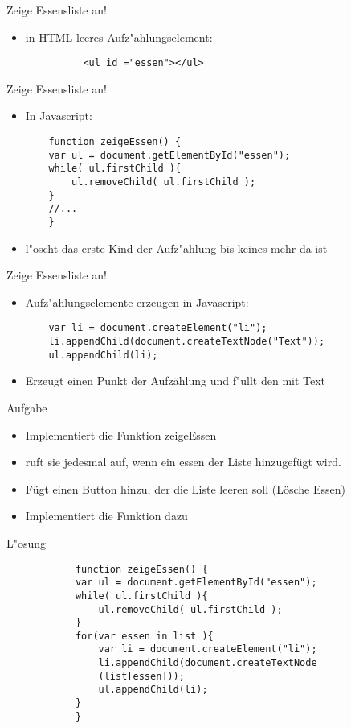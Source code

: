 \documentclass[18pt]{beamer}
\begin{document}
\begin{frame}[fragile]{Zeige Essensliste an!}
\begin{itemize}
	\item in HTML leeres Aufz"ahlungselement:
	\begin{lstlisting}
		  <ul id ="essen"></ul>
	\end{lstlisting}
\end{itemize}
\end{frame}
\begin{frame}[fragile]{Zeige Essensliste an!}
\begin{itemize}
	\item In Javascript: 
	\begin{lstlisting}
	function zeigeEssen() {
	var ul = document.getElementById("essen");
	while( ul.firstChild ){
		ul.removeChild( ul.firstChild );
	}
	//...
	}
	\end{lstlisting}
	\item l"oscht das erste Kind der Aufz"ahlung bis keines mehr da ist
\end{itemize}
\end{frame}

\begin{frame}[fragile]{Zeige Essensliste an!}
\begin{itemize}
	\item Aufz"ahlungselemente erzeugen in Javascript: 
	\begin{lstlisting}
	var li = document.createElement("li");
	li.appendChild(document.createTextNode("Text"));
	ul.appendChild(li);
	\end{lstlisting}
	\item Erzeugt einen Punkt der Aufzählung und f"ullt den mit Text
\end{itemize}
\end{frame}


\begin{frame}[fragile]{Aufgabe}
\begin{itemize}
	\item Implementiert die Funktion zeigeEssen
	\item ruft sie jedesmal auf, wenn ein essen der Liste hinzugefügt wird.
	\item Fügt einen Button hinzu, der die Liste leeren soll (Lösche Essen)
	\item Implementiert die Funktion dazu
\end{itemize}
\end{frame}

\begin{frame}[fragile]{L"osung}
		\begin{lstlisting}
			function zeigeEssen() {
			var ul = document.getElementById("essen");
			while( ul.firstChild ){
				ul.removeChild( ul.firstChild );
			}
			for(var essen in list ){
				var li = document.createElement("li");
				li.appendChild(document.createTextNode
				(list[essen]));
				ul.appendChild(li);
			}
			}
		\end{lstlisting}
\end{frame}
\end{document}
